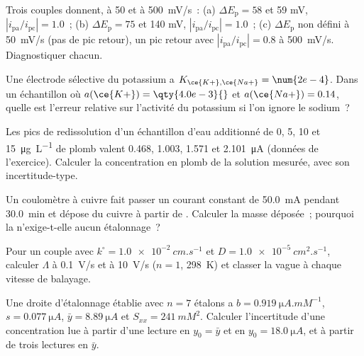 \begin{exercise}[$\star\star$]\label{exo:b3:electrode-kinetics:7}
Trois couples donnent, à 50 et à \qty{500}{mV/s}~: (a) $\Delta E_{\mathrm p} = 58$ et 59 mV, $|i_{\mathrm{pa}}/i_{\mathrm{pc}}| = 1.0$~;
(b) $\Delta E_{\mathrm p} = 75$ et 140 mV, $|i_{\mathrm{pa}}/i_{\mathrm{pc}}| = 1.0$~; (c) $\Delta E_{\mathrm p}$
non défini à \qty{50}{mV/s} (pas de
pic retour), un pic retour avec $|i_{\mathrm{pa}}/i_{\mathrm{pc}}| = 0.8$ à \qty{500}{mV/s}. Diagnostiquer chacun.
\end{exercise}

\begin{exercise}[$\star\star$]\label{exo:b3:electrode-kinetics:8}
Une électrode sélective du potassium a $K_{\ce{K+},\ce{Na+}} = \num{2e-4}$.
Dans un échantillon où $a(\ce{K+}) =
\qty{4.0e-3}{}$ et $a(\ce{Na+}) = 0.14$, quelle est l'erreur relative
sur l'activité du potassium si l'on ignore le sodium~?
\end{exercise}

\begin{exercise}[$\star\star$]\label{exo:b3:electrode-kinetics:9}
Les pics de redissolution d'un échantillon d'eau additionné de 0, 5, 10 et
\qty{15}{\micro g.L^{-1}} de plomb valent 0.468, 1.003, 1.571 et
\qty{2.101}{\micro A} (données de l'exercice). Calculer la concentration
en plomb de la solution mesurée, avec son incertitude-type.
\end{exercise}

\begin{exercise}[$\star\star\star$]\label{exo:b3:electrode-kinetics:10}
Un coulomètre à cuivre fait passer un courant constant de \qty{50.0}{mA}
pendant \qty{30.0}{min} et dépose du cuivre
à partir de . Calculer la masse déposée~; pourquoi la
 n'exige-t-elle aucun étalonnage~?
\end{exercise}

\begin{exercise}[$\star\star\star$]\label{exo:b3:electrode-kinetics:11}
Pour un couple avec $k^\circ = \qty{1.0e-2}{cm.s^{-1}}$ et $D = \qty{1.0e-5}{cm^2.s^{-1}}$, calculer $\Lambda$ à \qty{0.1}{V/s}
et à \qty{10}{V/s} ($n = 1$, \qty{298}{K}) et classer la vague à chaque
vitesse de balayage.
\end{exercise}

\begin{exercise}[$\star\star\star$]\label{exo:b3:electrode-kinetics:12}
Une droite d'étalonnage établie avec $n = 7$ étalons a $b = \qty{0.919}{\micro A.mM^{-1}}$, $s = \qty{0.077}{\micro A}$,
$\bar y = \qty{8.89}{\micro A}$ et $S_{xx} = \qty{241}{mM^2}$. Calculer
l'incertitude d'une concentration lue à partir d'une lecture en
$y_0 = \bar y$ et en $y_0 = \qty{18.0}{\micro A}$, et à partir de trois
lectures en $\bar y$.
\end{exercise}

